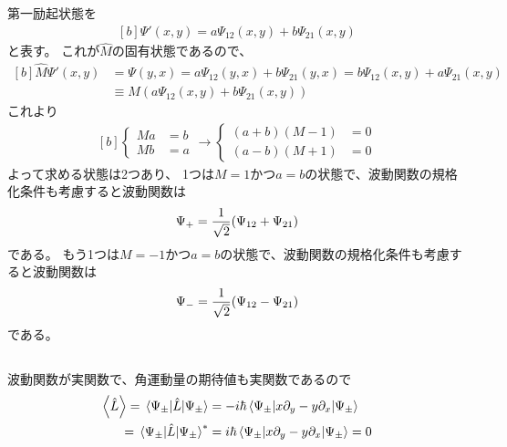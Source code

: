 \documentclass[../ap_2023.tex]{subfiles}
\begin{document}
\subsection{}
第一励起状態を
\begin{equation}\begin{aligned}[b]
    \Psi'(x,y)=a\Psi_{12}(x,y)+b\Psi_{21}(x,y)
\end{aligned}\end{equation}
と表す。
これが\(\hat{M}\)の固有状態であるので、
\begin{equation}\begin{aligned}[b]
    \hat{M}\Psi'(x,y)&=\Psi(y,x)
        = a\Psi_{12}(y,x)+b\Psi_{21}(y,x)
        =b\Psi_{12}(x,y)+a\Psi_{21}(x,y)\\
    &\equiv M(a\Psi_{12}(x,y)+b\Psi_{21}(x,y))
\end{aligned}\end{equation}
これより
\begin{equation}\begin{aligned}[b]
    \begin{cases}
        Ma &= b\\
        Mb &= a
    \end{cases}
    \rightarrow
    \begin{cases}
        (a+b)(M-1)&=0\\
        (a-b)(M+1)&=0
    \end{cases}
\end{aligned}\end{equation}
よって求める状態は2つあり、
1つは\(M=1\)かつ\(a=b\)の状態で、波動関数の規格化条件も考慮すると波動関数は
\begin{equation}\begin{aligned}[b]
    \Psi_+ = \frac{1}{\sqrt{2}}\qty(\Psi_{12}+\Psi_{21})
\end{aligned}\end{equation}
である。
もう1つは\(M=-1\)かつ\(a=b\)の状態で、波動関数の規格化条件も考慮すると波動関数は
\begin{equation}\begin{aligned}[b]
    \Psi_- = \frac{1}{\sqrt{2}}\qty(\Psi_{12}-\Psi_{21})
\end{aligned}\end{equation}
である。

\subsection{}
波動関数が実関数で、角運動量の期待値も実関数であるので
\begin{equation}\begin{aligned}[b]
    \ev{\hat{L}}=\mel{\Psi_\pm}{\hat{L}}{\Psi_\pm}&=-i\hbar\mel{\Psi_\pm}{x\partial_y-y\partial_x}{\Psi_\pm}\\
    =\mel{\Psi_\pm}{\hat{L}}{\Psi_\pm}^*&=i\hbar\mel{\Psi_\pm}{x\partial_y-y\partial_x}{\Psi_\pm}=0\\
\end{aligned}\end{equation}
\end{document}
